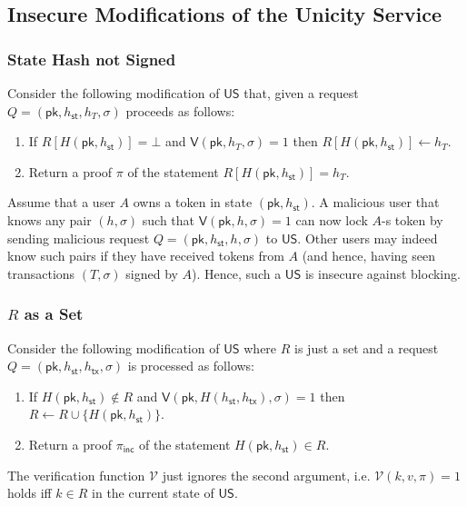 \documentclass{article}
\newcommand{\sigver}[0]{\mathsf{V}}
\newcommand{\pubkey}[0]{\mathsf{pk}}
\newcommand{\unisrv}[0]{\mathsf{US}}
\newcommand{\sthash}[0]{{h_\mathsf{st}}}
\newcommand{\txhash}[0]{{h_\mathsf{tx}}}
\newcommand{\univer}[0]{\mathcal{V}}
\newcommand{\pinc}[0]{{\pi_{\mathsf{inc}}}}
\begin{document}
\subsection{Insecure Modifications of the Unicity Service}

\subsubsection{State Hash not Signed}

Consider the following modification of $\mathsf{US}$ that, given a request $Q=(\pubkey, h_\mathsf{st}, h_T, \sigma)$ proceeds as follows:
\begin{enumerate}
\item If $R[H(\pubkey, h_\mathsf{st})]=\bot$ and $\sigver(\pubkey, h_T, \sigma)=1$ then $R[H(\pubkey, h_\mathsf{st})]\gets h_T$.
\item Return a proof $\pi$ of the statement $R[H(\pubkey, h_\mathsf{st})]=h_T$.
\end{enumerate}

\noindent Assume that a user $A$ owns a token in state $(\pubkey,\sthash)$.
A malicious user that knows any pair  $(h,\sigma)$ such that $\sigver(\pubkey,h,\sigma)=1$
can now lock $A$-s token by sending malicious request $Q=(\pubkey,\sthash, h, \sigma)$ to $\mathsf{US}$.
Other users may indeed know such pairs if they have received tokens from $A$ (and hence, having seen transactions $(T,\sigma)$ signed by $A$).
Hence, such a $\unisrv$ is insecure against blocking.

\subsubsection{$R$ as a Set}

Consider the following modification of $\mathsf{US}$ where $R$ is just a set and a request $Q=(\pubkey, \sthash, \txhash, \sigma)$ is processed as follows:
\begin{enumerate}
\item If $H(\pubkey, \sthash)\not\in R$ and $\mathsf{V}(\pubkey, H(\sthash, \txhash), \sigma)=1$ then $R\gets R \cup \{H(\pubkey, \sthash)\}$.
\item Return a proof $\pinc$ of the statement $H(\pubkey, \sthash)\in R$.
\end{enumerate}

\noindent The verification function $\univer$ just ignores the second argument, i.e.  $\univer(k,v,\pi)=1$ holds iff $k\in R$ in the current state of $\unisrv$. \medskip
\end{document}
